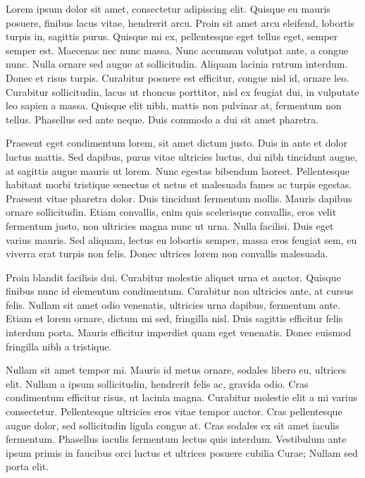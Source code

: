 \documentclass{article}
\begin{document}
\hspace{2cm}Lorem ipsum dolor sit amet, consectetur adipiscing elit. Quisque eu mauris posuere, finibus lacus vitae, hendrerit arcu. Proin sit amet arcu eleifend, lobortis turpis in, sagittis purus. Quisque mi ex, pellentesque eget tellus eget, semper semper est. Maecenas nec nunc massa. Nunc accumsan volutpat ante, a congue nunc. Nulla ornare sed augue at sollicitudin. Aliquam lacinia rutrum interdum. Donec et risus turpis. Curabitur posuere est efficitur, congue nisl id, ornare leo. Curabitur sollicitudin, lacus ut rhoncus porttitor, nisl ex feugiat dui, in vulputate leo sapien a massa. Quisque elit nibh, mattis non pulvinar at, fermentum non tellus. Phasellus sed ante neque. Duis commodo a dui sit amet pharetra.

\vspace{2cm}%
Praesent eget condimentum lorem, sit amet dictum justo. Duis in ante et dolor luctus mattis. Sed dapibus, purus vitae ultricies luctus, dui nibh tincidunt augue, at sagittis augue mauris ut lorem. Nunc egestas bibendum laoreet. Pellentesque habitant morbi tristique senectus et netus et malesuada fames ac turpis egestas. Praesent vitae pharetra dolor. Duis tincidunt fermentum mollis. Mauris dapibus ornare sollicitudin. Etiam convallis, enim quis scelerisque convallis, eros velit fermentum justo, non ultricies magna nunc ut urna. Nulla facilisi. Duis eget varius mauris. Sed aliquam, lectus eu lobortis semper, massa eros feugiat sem, eu viverra erat turpis non felis. Donec ultrices lorem non convallis malesuada.

\begin{doublespace}
Proin blandit facilisis dui. Curabitur molestie aliquet urna et auctor. Quisque finibus nunc id elementum condimentum. Curabitur non ultricies ante, at cursus felis. Nullam sit amet odio venenatis, ultricies urna dapibus, fermentum ante. Etiam et lorem ornare, dictum mi sed, fringilla nisl. Duis sagittis efficitur felis interdum porta. Mauris efficitur imperdiet quam eget venenatis. Donec euismod fringilla nibh a tristique.
\end{doublespace}
\newpage
\begin{spacing}{3}%
Nullam sit amet tempor mi. Mauris id metus ornare, sodales libero eu, ultrices elit. Nullam a ipsum sollicitudin, hendrerit felis ac, gravida odio. Cras condimentum efficitur risus, ut lacinia magna. Curabitur molestie elit a mi varius consectetur. Pellentesque ultricies eros vitae tempor auctor. Cras pellentesque augue dolor, sed sollicitudin ligula congue at. Cras sodales ex sit amet iaculis fermentum. Phasellus iaculis fermentum lectus quis interdum. Vestibulum ante ipsum primis in faucibus orci luctus et ultrices posuere cubilia Curae; Nullam sed porta elit.
\end{spacing}
\end{document}
